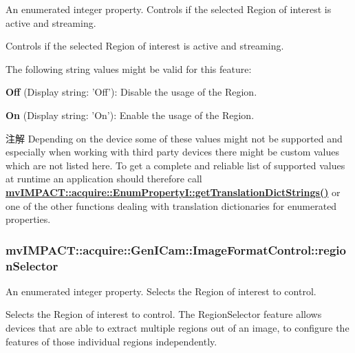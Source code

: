 An enumerated integer property. Controls if the selected Region of interest is active and streaming. 

Controls if the selected Region of interest is active and streaming.

The following string values might be valid for this feature\+:
\begin{DoxyItemize}
\item {\bfseries Off} (Display string\+: 'Off')\+: Disable the usage of the Region.
\item {\bfseries On} (Display string\+: 'On')\+: Enable the usage of the Region.
\end{DoxyItemize}

\begin{DoxyNote}{注解}
Depending on the device some of these values might not be supported and especially when working with third party devices there might be custom values which are not listed here. To get a complete and reliable list of supported values at runtime an application should therefore call {\bfseries \hyperlink{classmv_i_m_p_a_c_t_1_1acquire_1_1_enum_property_i_a0ba6ccbf5ee69784d5d0b537924d26b6}{mv\+I\+M\+P\+A\+C\+T\+::acquire\+::\+Enum\+Property\+I\+::get\+Translation\+Dict\+Strings()}} or one of the other functions dealing with translation dictionaries for enumerated properties. 
\end{DoxyNote}
\hypertarget{classmv_i_m_p_a_c_t_1_1acquire_1_1_gen_i_cam_1_1_image_format_control_aad28b74200b11a31434c8bfeedc408e2}{
\subsubsection[{region\+Selector}]{ mv\+I\+M\+P\+A\+C\+T\+::acquire\+::\+Gen\+I\+Cam\+::\+Image\+Format\+Control\+::region\+Selector}}\label{classmv_i_m_p_a_c_t_1_1acquire_1_1_gen_i_cam_1_1_image_format_control_aad28b74200b11a31434c8bfeedc408e2}


An enumerated integer property. Selects the Region of interest to control. 

Selects the Region of interest to control. The Region\+Selector feature allows devices that are able to extract multiple regions out of an image, to configure the features of those individual regions independently.

